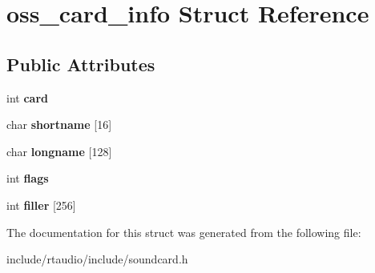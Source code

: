 \hypertarget{structoss__card__info}{}\section{oss\+\_\+card\+\_\+info Struct Reference}
\label{structoss__card__info}
\subsection*{Public Attributes}
\begin{DoxyCompactItemize}
\item 
int {\bfseries card}\hypertarget{structoss__card__info_a3ea3d7f97762863adfaf7534ac25fec6}{}\label{structoss__card__info_a3ea3d7f97762863adfaf7534ac25fec6}

\item 
char {\bfseries shortname} \mbox{[}16\mbox{]}\hypertarget{structoss__card__info_a3e83678a035fe8f7c484c31ba3eb78d0}{}\label{structoss__card__info_a3e83678a035fe8f7c484c31ba3eb78d0}

\item 
char {\bfseries longname} \mbox{[}128\mbox{]}\hypertarget{structoss__card__info_a674520bf0d7ceff4cbcde22bdd8ce6ad}{}\label{structoss__card__info_a674520bf0d7ceff4cbcde22bdd8ce6ad}

\item 
int {\bfseries flags}\hypertarget{structoss__card__info_add036257b05afb142face5cf75bc1389}{}\label{structoss__card__info_add036257b05afb142face5cf75bc1389}

\item 
int {\bfseries filler} \mbox{[}256\mbox{]}\hypertarget{structoss__card__info_aee32283b34008ab4d6eca87024763e11}{}\label{structoss__card__info_aee32283b34008ab4d6eca87024763e11}

\end{DoxyCompactItemize}


The documentation for this struct was generated from the following file\+:\begin{DoxyCompactItemize}
\item 
include/rtaudio/include/soundcard.\+h\end{DoxyCompactItemize}
